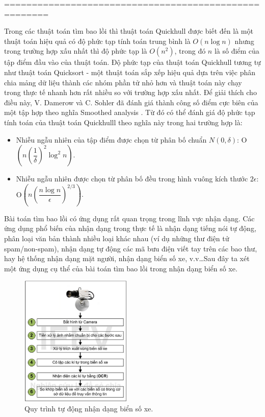 \documentclass[12pt,a4paper,openany,oneside]{report}
\begin{document}
======================================================













Trong các thuật toán tìm bao lồi thì thuật toán Quickhull \cite{David-2002, Rourke-1998} được biết đến là một thuật toán hiệu quả có độ phức tạp tính toán trung bình là $O(n \log n)$ nhưng trong trường hợp xấu nhất thì độ phức tạp là $O(n^2)$, trong đó $n$ là số điểm của tập điểm đầu vào của thuật toán. Độ phức tạp của thuật toán Quickhull tương tự như thuật toán Quicksort - một thuật toán sắp xếp hiệu quả dựa trên việc phân chia mảng dữ liệu thành các nhóm phần tử nhỏ hơn và thuật toán này chạy trong thực tế nhanh hơn rất nhiều so với trường hợp xấu nhất. Để giải thích cho điều này, V. Damerow và C. Sohler đã đánh giá thành công số điểm cực biên của một tập hợp theo nghĩa Smoothed analysis \cite{Damerow-2004}. Từ đó có thể đánh giá độ phức tạp tính toán của thuật toán Quickhulll theo nghĩa này trong hai trường hợp là:
\begin{itemize}
	\item Nhiễu ngẫu nhiên của tập điểm được chọn từ phân bố chuẩn $N(0, \delta)$: 
	O$\left( n \left(\dfrac{1}{\delta} \right)^2 \log^2 n\right) $.
	\item Nhiễu ngẫu nhiên được chọn từ phân bố đều trong hình vuông kích thước $2 \epsilon$: 
	O$\left( n \left(\dfrac{n \log n}{\epsilon} \right)^{2/3}\right). $
\end{itemize}

Bài toán tìm bao lồi có ứng dụng rất quan trọng trong lĩnh vực nhận dạng. Các ứng dụng phổ biến của nhận dạng trong thực tế là nhận dạng tiếng nói tự động, phân loại văn bản thành nhiều loại khác nhau (ví dụ những thư điện tử spam/non-spam), nhận dạng tự động các mã bưu điện viết tay trên các bao thư, hay hệ thống nhận dạng mặt người, nhận dạng biển số xe, v.v\ldots Sau đây ta xét một ứng dụng cụ thể của bài toán tìm bao lồi trong nhận dạng biển số xe. 
\begin{figure}[ht!]
	\begin{center}
		\includegraphics[width=200px]{./nhandang1.PNG}
		\caption{Quy trình tự động nhận dạng biển số xe.}
		\label{fig_dhandang1}
	\end{center}
\end{figure} 
\end{document}
